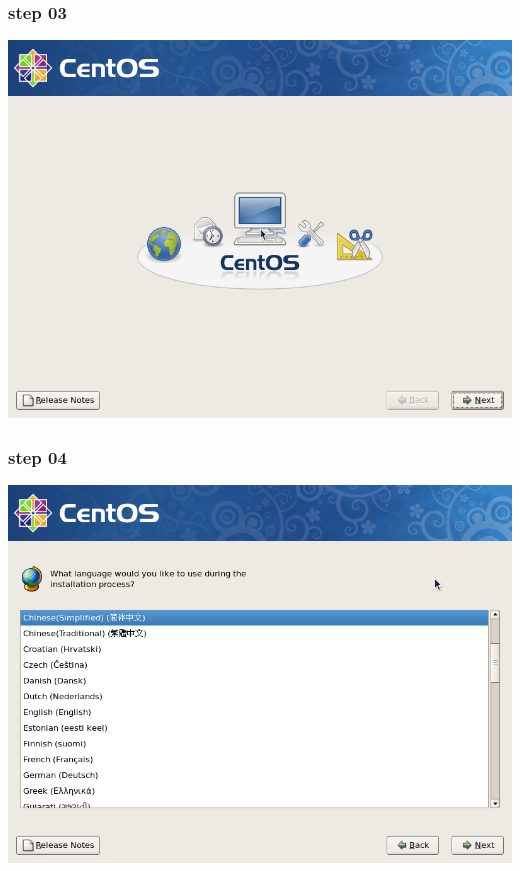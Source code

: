 \documentclass[xcolor=svgnames,presentation]{beamer}
\begin{document}
\begin{frame}
\frametitle{step 03}
\label{sec-2-3}

\begin{center}
\includegraphics[width=.9\linewidth]{img/img08.png}
\end{center}
\end{frame}
\begin{frame}
\frametitle{step 04}
\label{sec-2-4}

\begin{center}
\includegraphics[width=.9\linewidth]{img/img09.png}
\end{center}
\end{frame}
\end{document}
